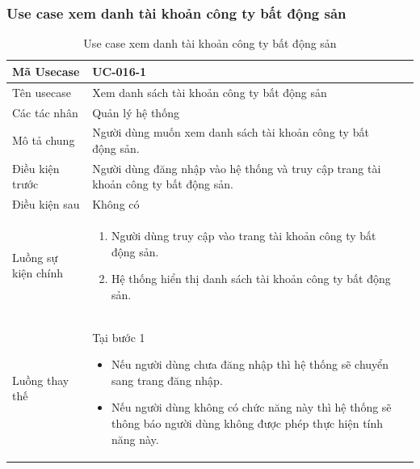 \documentclass[12pt,a4paper]{article}
\begin{document}
    \subsubsection*{Use case xem danh tài khoản công ty bất động sản }
    \begin{table}[H]
        \centering
        \begin{tabular}{|p{3.5cm}|p{11.5cm}|c|}
            \hline
            Mã Usecase      & UC-016-1                                                                            \\
            \hline
            Tên usecase     & Xem danh sách tài khoản công ty bất động sản                                        \\
            \hline
            Các tác nhân    & Quản lý hệ thống                                                                    \\
            \hline
            Mô tả chung     & Người dùng muốn xem danh sách tài khoản công ty bất động sản.                       \\
            \hline

            Điều kiện trước & Người dùng đăng nhập vào hệ thống và truy cập trang tài khoản công ty bất động sản. \\
            \hline

            Điều kiện sau   & Không có                                                                            \\
            \hline

            Luồng sự kiện chính & \vspace{-.8cm}\begin{enumerate}
                                                    \item Người dùng truy cập vào trang tài khoản công ty bất động sản.
                                                    \item Hệ thống hiển thị danh sách tài khoản công ty bất động sản.
            \end{enumerate}
            \\
            \hline
            Luồng thay thế & Tại bước 1\newline
            \vspace{-.8cm}\begin{itemize}
                              \item Nếu người dùng chưa đăng nhập thì hệ thống sẽ chuyển sang trang đăng nhập.
                              \item  Nếu người dùng không có chức năng này thì hệ thống sẽ thông báo người dùng không được phép thực hiện tính năng này.
            \end{itemize}

            \\    \hline
        \end{tabular}
        \caption{Use case xem danh tài khoản công ty bất động sản }
    \end{table}
\end{document}
